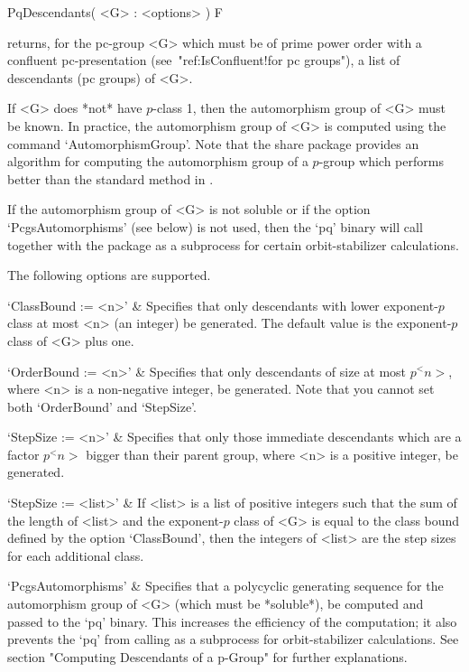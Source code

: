 \>PqDescendants( <G> : <options> ) F

returns, for the pc-group <G> which must be of prime power order  with  a
confluent pc-presentation (see~"ref:IsConfluent!for pc groups"),  a  list
of descendants (pc groups) of <G>.

If <G> does *not* have $p$-class 1, then the automorphism  group  of  <G>
must be known. In practice, the automorphism group  of  <G>  is  computed
using the {\GAP} command `AutomorphismGroup'. Note that the {\GAP}  share
package {\AutPGrp} provides an algorithm for computing  the  automorphism
group of a $p$-group which performs better than the  standard  method  in
{\GAP}.

If the automorphism group  of  <G>  is  not  soluble  or  if  the  option
`PcgsAutomorphisms' (see below) is not used, then the  `pq'  binary  will
call {\GAP} together with the {\AutPGrp}  package  as  a  subprocess  for
certain orbit-stabilizer calculations.

The following options are supported.

\beginitems

`ClassBound := <n>' &
Specifies that only descendants with lower exponent-$p$ class at most <n>
(an integer) be generated. The default value is the exponent-$p$ class of
<G> plus one.

`OrderBound := <n>' &
Specifies that only descendants of size at most $p^<n>$, where <n>  is  a
non-negative integer,  be  generated.  Note  that  you  cannot  set  both
`OrderBound' and `StepSize'.

`StepSize := <n>' &
Specifies that only  those  immediate  descendants  which  are  a  factor
$p^<n>$ bigger than their parent group, where <n> is a positive  integer,
be generated.

`StepSize := <list>' &
If <list> is a list of positive integers such that the sum of the  length
of <list> and the exponent-$p$ class of <G> is equal to the  class  bound
defined by the option `ClassBound', then the integers of <list>  are  the
step sizes for each additional class.

`PcgsAutomorphisms' &
Specifies that a polycyclic  generating  sequence  for  the  automorphism
group of <G> (which must be *soluble*), be computed  and  passed  to  the
`pq' binary. This increases the efficiency of the  computation;  it  also
prevents  the  `pq'   from   calling   {\GAP}   as   a   subprocess   for
orbit-stabilizer calculations. See section "Computing  Descendants  of  a
p-Group" for further explanations.

